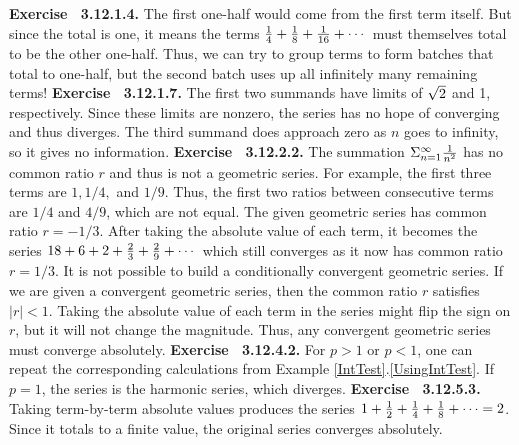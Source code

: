  {\noindent \protect \bf  Exercise ~3.12.1.4.} The first one-half would come from the first term itself. But since the total is one, it means the terms $\protect \frac  {1}{4}+\protect \frac  {1}{8}+\protect \frac  {1}{16}+\protect \cdots  $ must themselves total to be the other one-half. Thus, we can try to group terms to form batches that total to one-half, but the second batch uses up all infinitely many remaining terms!  \protect \newline  \protect \newline  
 {\noindent \protect \bf  Exercise ~3.12.1.7.} The first two summands have limits of $\protect \sqrt  {2}$ and 1, respectively. Since these limits are nonzero, the series has no hope of converging and thus diverges. The third summand does approach zero as $n$ goes to infinity, so it gives no information. \protect \newline  \protect \newline  
 {\noindent \protect \bf  Exercise ~3.12.2.2.} \textbullet The summation $\Sigma _{n=1}^\infty \protect \frac  {1}{n^2}$ has no common ratio $r$ and thus is not a geometric series. For example, the first three terms are $1,1/4,$ and $1/9$. Thus, the first two ratios between consecutive terms are $1/4$ and $4/9$, which are not equal. \textbullet The given geometric series has common ratio $r=-1/3$. After taking the absolute value of each term, it becomes the series $18+6+2+\protect \frac  {2}{3}+\protect \frac  {2}{9}+\protect \cdots  $ which still converges as it now has common ratio $r=1/3$. \textbullet It is not possible to build a conditionally convergent geometric series. If we are given a convergent geometric series, then the common ratio $r$ satisfies $|r|<1$. Taking the absolute value of each term in the series might flip the sign on $r$, but it will not change the magnitude. Thus, any convergent geometric series must converge absolutely. \protect \newline  \protect \newline  
 {\noindent \protect \bf  Exercise ~3.12.4.2.} For $p>1$ or $p<1$, one can repeat the corresponding calculations from Example \protect \ref  {IntTest}.\protect \ref  {UsingIntTest}. If $p=1$, the series is the harmonic series, which diverges. \protect \newline  \protect \newline  
 {\noindent \protect \bf  Exercise ~3.12.5.3.} Taking term-by-term absolute values produces the series $1+\protect \frac  {1}{2}+\protect \frac  {1}{4}+\protect \frac  {1}{8}+\protect \cdots  =2$. Since it totals to a finite value, the original series converges absolutely. \protect \newline  \protect \newline  
